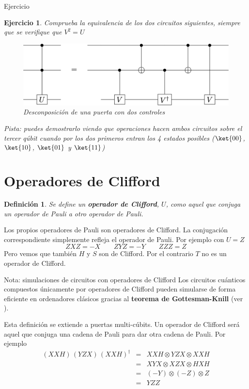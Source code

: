 \documentclass[a4paper,11pt]{book} %
\newtheorem{definicion_contador}{Definición}
\newcommand{\Definicion}[1]{
		\begin{mybox_gray2}{}
			\begin{definicion_contador}
				 #1 
			\end{definicion_contador} 
		\end{mybox_gray2}
	}
\newtheorem{ejercicio_contador}{Ejercicio}
\newcommand{\Ejercicio}[1]{
		\begin{mybox_gray}{Ejercicio} 
			\begin{ejercicio_contador}
				 #1 
			\end{ejercicio_contador} 
		\end{mybox_gray}
	}
\numberwithin{equation}{chapter}
\begin{document}
	\Ejercicio{
	Comprueba la equivalencia de los dos circuitos siguientes, siempre que se verifique que $V^2 = U$
		\begin{figure}[H]
		\centering 
		\includegraphics[width=0.60\linewidth]{Figuras/Fig_elementos_CCUdecomposition}
		\caption{Desconposición de una puerta con dos controles}
		\label{Fig_elementos_CCUdecomposition}
		\end{figure}
	Pista: puedes demostrarlo viendo que operaciones hacen ambos circuitos sobre el tercer qúbit cuando por los dos
	primeros entran los 4 estados posibles ($\ket{00}$, $\ket{10}$, $\ket{01}$ y $\ket{11}$)
	}		
	
    \section{Operadores de Clifford}

	\Definicion{
	Se define un \textbf{operador de Clifford}, $U$, como aquel que conjuga un operador de Pauli a otro operador de Pauli.
	}
	
	Los propios operadores de Pauli son operadores de Clifford.  La conjugación correspondiente simplemente refleja el operador de Pauli. Por ejemplo con $U=Z$
	$$
	ZXZ = -X~~~~~~~~~ZYZ = -Y ~~~~~~~~~ZZZ = Z 
	$$
Pero vemos que también $H$ y $S$ son de Clifford. Por el contrario $T$ no es un operador de Clifford.

	\begin{mybox_blue}{Nota: simulaciones de circuitos con operadores de Clifford}
	Los circuitos cuánticos compuestos únicamente por operadores de Clifford pueden simularse de forma eficiente en ordenadores
	clásicos gracias al \textbf{teorema de Gottesman-Knill} (ver \cite{bib_Gottesman-Knill}).
	\end{mybox_blue}

Esta definición se extiende a puertas multi-cúbits. Un operador de Clifford será aquel que conjuga una cadena de Pauli para dar otra cadena de Pauli. Por ejemplo
	\begin{eqnarray*}
	(XXH) \, (YZX) \,  (XXH)^\dagger &=& XXH \otimes YZX \otimes XXH \\ 
	&=& XYX \otimes  XZX \otimes HXH \\ 
	&=& (-Y)\otimes (-Z) \otimes Z \\ 
	&=& YZZ
	\end{eqnarray*}
\end{document}
